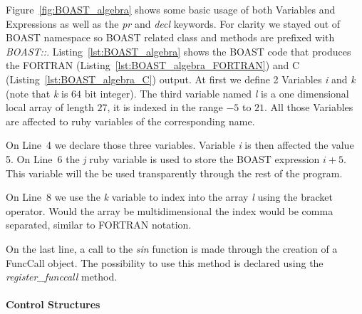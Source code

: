 \documentclass[11pt, a4paper, twoside]{montblanc}
\begin{document}
Figure~\ref{fig:BOAST_algebra} shows some basic usage of both Variables and
Expressions as well as the \emph{pr} and \emph{decl} keywords. For clarity we
stayed out of BOAST namespace so BOAST related class and methods are prefixed
with \emph{BOAST::}. Listing~\ref{lst:BOAST_algebra} shows the BOAST code that
produces the FORTRAN (Listing~\ref{lst:BOAST_algebra_FORTRAN}) and C
(Listing~\ref{lst:BOAST_algebra_C}) output. At first we define 2 Variables
\emph{i} and \emph{k} (note that \emph{k} is $64$ bit integer). The third
variable named \emph{l} is a one dimensional local array of length $27$, it
is indexed in the range $-5$ to $21$. All those Variables are affected to ruby
variables of the corresponding name.

On Line~4 we declare those three variables. Variable \emph{i} is then affected
the value 5. On Line~6 the \emph{j} ruby variable is used to store the BOAST
expression \emph{$i+5$}. This variable will the be used transparently through
the rest of the program.

On Line~8 we use the \emph{k} variable to index into the array \emph{l} using
the bracket operator. Would the array be multidimensional the index would be
comma separated, similar to FORTRAN notation.

On the last line, a call to the \emph{sin} function is made through the creation
of a FuncCall object.  The possibility to use this method is declared using the
\emph{register\_funccall} method.

      \paragraph{Control Structures}
\end{document}
